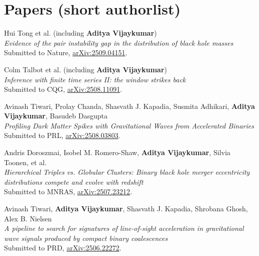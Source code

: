     \section{Papers (short authorlist)}
\begin{etaremune}

        \item Hui Tong et al. (including \textbf{Aditya Vijaykumar}) \\
        \textit{Evidence of the pair instability gap in the distribution of black hole masses}\\
        Submitted to Nature, \href{https://arxiv.org/abs/2509.04151}{arXiv:2509.04151}.

        \item Colm Talbot et al. (including \textbf{Aditya Vijaykumar}) \\
        \textit{Inference with finite time series II: the window strikes back}\\
        Submitted to CQG, \href{https://arxiv.org/abs/2508.11091}{arXiv:2508.11091}.

        \item Avinash Tiwari, Prolay Chanda, Shasvath J. Kapadia, Susmita Adhikari, \textbf{Aditya Vijaykumar}, Basudeb Dasgupta\\
        \textit{Profiling Dark Matter Spikes with Gravitational Waves from Accelerated Binaries}\\
        Submitted to PRL, \href{https://arxiv.org/abs/2508.03803}{arXiv:2508.03803}.

        \item Andris Doroszmai, Isobel M. Romero-Shaw, \textbf{Aditya Vijaykumar}, Silvia Toonen, et al.\\
        \textit{Hierarchical Triples vs. Globular Clusters: Binary black hole merger eccentricity distributions compete and evolve with redshift}\\
        Submitted to MNRAS, \href{https://arxiv.org/abs/2507.23212}{arXiv:2507.23212}.

        \item Avinash Tiwari, \textbf{Aditya Vijaykumar}, Shasvath J. Kapadia, Shrobana Ghosh, Alex B. Nielsen\\
        \textit{A pipeline to search for signatures of line-of-sight acceleration in gravitational wave signals produced by compact binary coalescences}\\
        Submitted to PRD, \href{https://arxiv.org/abs/2506.22272}{arXiv:2506.22272}.


\end{etaremune}
